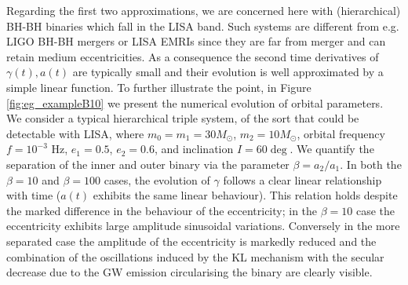 \documentclass[a4paper,fleqn,usenatbib]{mnras}
\begin{document}
\noindent Regarding the first two approximations, we are concerned here with (hierarchical) BH-BH binaries which fall in the LISA band. Such systems are different from e.g. LIGO BH-BH mergers or LISA EMRIs since they are far from merger and can retain medium eccentricities. As a consequence the second time derivatives of $\gamma(t), a(t)$ are typically small and their evolution is well approximated by a simple linear function. To further illustrate the point, in Figure \ref{fig:eg_exampleB10} we present the numerical evolution of orbital parameters. We consider a typical hierarchical triple system, of the sort that could be detectable with LISA, where $m_0 = m_1 = 30 M_{\odot}$, $m_2 = 10 M_{\odot}$, orbital frequency $f =10^{-3}$ Hz, $e_1 = 0.5$, $e_2 = 0.6$, and inclination $I = 60 \deg$. We quantify the separation of the inner and outer binary via the parameter $\beta = a_2/a_1$. In both the $\beta = 10$ and $\beta = 100$ cases, the evolution of $\gamma$ follows a clear linear relationship with time ($a(t)$ exhibits the same linear behaviour). This relation holds despite the marked difference in the behaviour of the eccentricity; in the $\beta=10$ case the eccentricity exhibits large amplitude sinusoidal variations. Conversely in the more separated case the amplitude of the eccentricity is markedly reduced and the combination of the oscillations induced by the KL mechanism with the secular decrease due to the GW emission circularising the binary are clearly visible. \newline 
\end{document}
